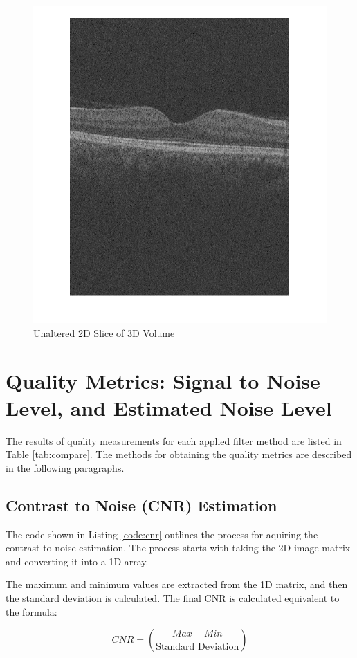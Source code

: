 \documentclass[%
reprint,
showpacs,preprintnumbers,
bibnotes,
amsmath,amssymb,
aps,
pra,
]{revtex4-1}
\begin{document}
		\begin{figure}
			\centering
			\includegraphics[width=0.8\linewidth]{Figures/2dslice}
			\caption{Unaltered 2D Slice of 3D Volume}
			\label{fig:2dslice}
		\end{figure}

	\section{\label{sec:level1} Quality Metrics: Signal to Noise Level, and Estimated Noise Level}
		The results of quality measurements for each applied filter method are listed in Table \ref{tab:compare}. The methods for obtaining the quality metrics are described in the following paragraphs.

	\subsection{\label{sec:level2} Contrast to Noise (CNR) Estimation}
		The code shown in Listing \ref{code:cnr} outlines the process for aquiring the contrast to noise estimation. The process starts with taking the 2D image matrix and converting it into a 1D array.
	
		The maximum and minimum values are extracted from the 1D matrix, and then the standard deviation is calculated. The final CNR is calculated equivalent to the formula:
	
		$$CNR = (\frac{Max-Min}{\text{Standard Deviation}})$$
\end{document}
